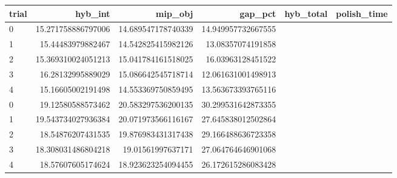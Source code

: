 \begin{tabular}{lrrrrr}
\hline
trial & hyb_int & mip_obj & gap_pct & hyb_total & polish_time \\ \hline
0 & 15.271758886797006 & 14.689547178740339 & 14.949957732667555 &  &  \\
1 & 15.44483979882467 & 14.542825415982126 & 13.08357074191858 &  &  \\
2 & 15.369310024051213 & 15.041784161518025 & 16.03963128451522 &  &  \\
3 & 16.28132995889029 & 15.086642545718714 & 12.061631001498913 &  &  \\
4 & 15.16605002191498 & 14.553369750859495 & 13.563673393765116 &  &  \\
0 & 19.12580588573462 & 20.583297536200135 & 30.299531642873355 &  &  \\
1 & 19.543734027936384 & 20.071973566116167 & 27.645838012502864 &  &  \\
2 & 18.54876207431535 & 19.876983431317438 & 29.166488636723358 &  &  \\
3 & 18.308031486804218 & 19.01561997637171 & 27.064764646901068 &  &  \\
4 & 18.57607605174624 & 18.923623254094455 & 26.172615286083428 &  &  \\
\hline
\end{tabular}
